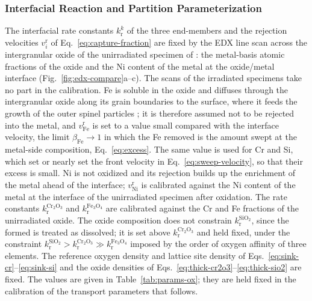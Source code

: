 \documentclass[3p,times,nonatbib]{elsarticle} %
\begin{document}
\subsubsection{Interfacial Reaction and Partition Parameterization}
\label{sec:methodGBOXidationCalibration}
The interfacial rate constants \(k_{\mathrm{r}}^{k}\) of the three end-members
and the rejection velocities \(v_i^{\mathrm{r}}\) of
Eq.~\eqref{eq:capture-fraction} are fixed by the EDX line scan across the
intergranular oxide of the unirradiated specimen of \textcite{deng2017effect}:
the metal-basis atomic fractions of the oxide and the Ni content of the metal
at the oxide/metal interface (Fig.~\ref{fig:edx-compare}a--c). The scans of the irradiated specimens take no part in the
calibration. Fe is soluble in the oxide and
diffuses through the intergranular oxide along its grain boundaries to the
surface, where it feeds the growth of the outer spinel particles
\cite{deng2020corrosion}; it is therefore assumed not to be rejected
into the metal, and \(v_{\mathrm{Fe}}^{\mathrm{r}}\) is set to a value small
compared with the interface velocity, the limit \(\beta_{\mathrm{Fe}}\to1\) in
which the Fe removed is the amount swept at the metal-side composition,
Eq.~\eqref{eq:excess}. The same value is used for Cr and Si, which set or
nearly set the front velocity in Eq.~\eqref{eq:sweep-velocity}, so that their
excess is small. Ni is not oxidized and its rejection builds up the enrichment
of the metal ahead of the interface; \(v_{\mathrm{Ni}}^{\mathrm{r}}\) is
calibrated against the Ni content of the metal at the interface of the
unirradiated specimen after oxidation. The rate
constants \(k_{\mathrm{r}}^{\mathrm{Cr_2O_3}}\) and
\(k_{\mathrm{r}}^{\mathrm{Fe_3O_4}}\) are calibrated against the Cr and Fe
fractions of the unirradiated oxide. The oxide composition does not constrain
\(k_{\mathrm{r}}^{\mathrm{SiO_2}}\), since the  formed is treated as
dissolved; it is set above \(k_{\mathrm{r}}^{\mathrm{Cr_2O_3}}\) and held
fixed, under the constraint
\(k_{\mathrm{r}}^{\mathrm{SiO_2}}>k_{\mathrm{r}}^{\mathrm{Cr_2O_3}}
\gg k_{\mathrm{r}}^{\mathrm{Fe_3O_4}}\) imposed by the order of oxygen affinity of three elements\cite{young2016high}. The reference oxygen
density and lattice site density of Eqs.~\eqref{eq:sink-cr}--\eqref{eq:sink-si}
and the oxide densities of Eqs.~\eqref{eq:thick-cr2o3}--\eqref{eq:thick-sio2}
are fixed. The values are given in Table~\ref{tab:params-ox}; they are held
fixed in the calibration of the transport parameters that follows.
\end{document}
